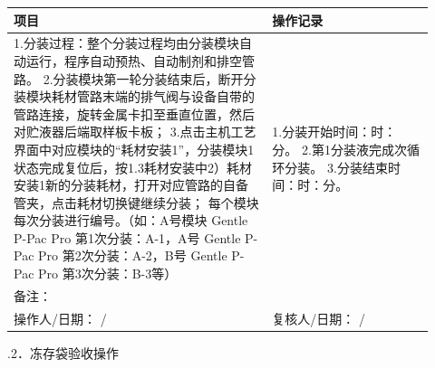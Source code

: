 \documentclass[UTF8,10pt,a4paper,fontset=fandol]{ctexart}
\newcommand{\fieldvalue}[1]{#1}
\newcommand{\handwritten}[1]{#1}
\begin{document}
\begin{center}
\begin{tabular}{|p{0.57\linewidth}|p{0.35\linewidth}|}
\hline
\centering 项目 & \centering 操作记录 \tabularnewline
\hline
1.分装过程：整个分装过程均由分装模块自动运行，程序自动预热、自动制剂和排空管路。%
\newline
2.分装模块第一轮分装结束后，断开分装模块耗材管路末端的排气阀与设备自带的管路连接，旋转金属卡扣至垂直位置，然后对贮液器后端取样板卡板；
\newline
3.点击主机工艺界面中对应模块的“耗材安装1”，分装模块1状态完成复位后，按1.3耗材安装中2）耗材安装1新的分装耗材，打开对应管路的自备管夹，点击耗材切换键继续分装；
\newline
每个模块每次分装进行编号。（如：A号模块 Gentle P-Pac Pro 第1次分装：A-1，A号 Gentle P-Pac Pro 第2次分装：A-2，B号 Gentle P-Pac Pro 第3次分装：B-3等） &
1.分装开始时间：\underline{\hspace{1.2cm}}时：\underline{\hspace{1.2cm}}分。
\newline
2.第1分装液完成\underline{\hspace{1.0cm}}次循环分装。
\newline
3.分装结束时间：\underline{\hspace{1.2cm}}时：\underline{\hspace{1.2cm}}分。
\tabularnewline
\hline
备注： & \tabularnewline
\hline
操作人/日期：%
\newline
\fieldvalue{\handwritten{/}} &
复核人/日期：%
\newline
\fieldvalue{\handwritten{/}}
\tabularnewline
\hline
\end{tabular}
\end{center}

.2．冻存袋验收操作
\end{document}
